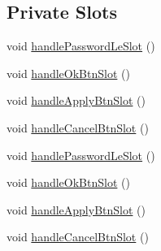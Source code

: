 \subsection*{Private Slots}
\begin{DoxyCompactItemize}
\item 
void \hyperlink{class_user_abstract_gui_aa59b7d4a4305617cd46bd2c9d75a141c}{handle\-Password\-Le\-Slot} ()
\item 
void \hyperlink{class_user_abstract_gui_a96934bc8bb831a8bdf0abd44bfa4c975}{handle\-Ok\-Btn\-Slot} ()
\item 
void \hyperlink{class_user_abstract_gui_a465b020f33a4ee98439a09dc349da57b}{handle\-Apply\-Btn\-Slot} ()
\item 
void \hyperlink{class_user_abstract_gui_a20759a96c5f756eec72b47e239cd5ce8}{handle\-Cancel\-Btn\-Slot} ()
\item 
void \hyperlink{class_user_abstract_gui_aa59b7d4a4305617cd46bd2c9d75a141c}{handle\-Password\-Le\-Slot} ()
\item 
void \hyperlink{class_user_abstract_gui_a96934bc8bb831a8bdf0abd44bfa4c975}{handle\-Ok\-Btn\-Slot} ()
\item 
void \hyperlink{class_user_abstract_gui_a465b020f33a4ee98439a09dc349da57b}{handle\-Apply\-Btn\-Slot} ()
\item 
void \hyperlink{class_user_abstract_gui_a20759a96c5f756eec72b47e239cd5ce8}{handle\-Cancel\-Btn\-Slot} ()
\end{DoxyCompactItemize}
